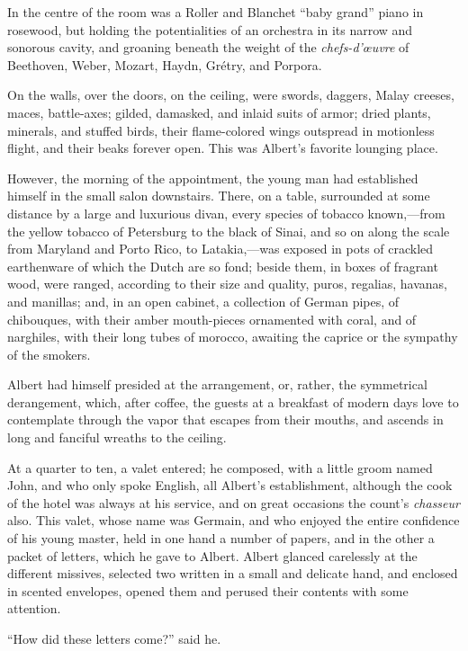 In the centre of the room was a Roller and Blanchet “baby grand” piano
in rosewood, but holding the potentialities of an orchestra in its
narrow and sonorous cavity, and groaning beneath the weight of the
\textit{chefs-d’œuvre} of Beethoven, Weber, Mozart, Haydn, Grétry, and
Porpora.

On the walls, over the doors, on the ceiling, were swords, daggers,
Malay creeses, maces, battle-axes; gilded, damasked, and inlaid suits
of armor; dried plants, minerals, and stuffed birds, their
flame-colored wings outspread in motionless flight, and their beaks
forever open. This was Albert’s favorite lounging place.

However, the morning of the appointment, the young man had established
himself in the small salon downstairs. There, on a table, surrounded at
some distance by a large and luxurious divan, every species of tobacco
known,—from the yellow tobacco of Petersburg to the black of Sinai, and
so on along the scale from Maryland and Porto Rico, to Latakia,—was
exposed in pots of crackled earthenware of which the Dutch are so fond;
beside them, in boxes of fragrant wood, were ranged, according to their
size and quality, puros, regalias, havanas, and manillas; and, in an
open cabinet, a collection of German pipes, of chibouques, with their
amber mouth-pieces ornamented with coral, and of narghiles, with their
long tubes of morocco, awaiting the caprice or the sympathy of the
smokers.

Albert had himself presided at the arrangement, or, rather, the
symmetrical derangement, which, after coffee, the guests at a breakfast
of modern days love to contemplate through the vapor that escapes from
their mouths, and ascends in long and fanciful wreaths to the ceiling.

At a quarter to ten, a valet entered; he composed, with a little groom
named John, and who only spoke English, all Albert’s establishment,
although the cook of the hotel was always at his service, and on great
occasions the count’s \textit{chasseur} also. This valet, whose name was
Germain, and who enjoyed the entire confidence of his young master,
held in one hand a number of papers, and in the other a packet of
letters, which he gave to Albert. Albert glanced carelessly at the
different missives, selected two written in a small and delicate hand,
and enclosed in scented envelopes, opened them and perused their
contents with some attention.

“How did these letters come?” said he.

